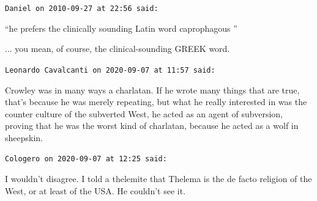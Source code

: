 \begin{footnotesize}
\begin{sffamily}
\texttt{Daniel on 2010-09-27 at 22:56 said:}

``he prefers the clinically sounding Latin word caprophagous ''

... you mean, of course, the clinical-sounding GREEK word.


\hfill

\texttt{Leonardo Cavalcanti on 2020-09-07 at 11:57 said:}

Crowley was in many ways a charlatan. If he wrote many things that are true, that's because he was merely repeating, but what he really interested in was the counter culture of the subverted West, he acted as an agent of subversion, proving that he was the worst kind of charlatan, because he acted as a wolf in sheepskin.

\hfill

\texttt{Cologero on 2020-09-07 at 12:25 said:}

I wouldn't disagree. I told a thelemite that Thelema is the de facto religion of the West, or at least of the USA. He couldn't see it.

\end{sffamily}
\end{footnotesize}

